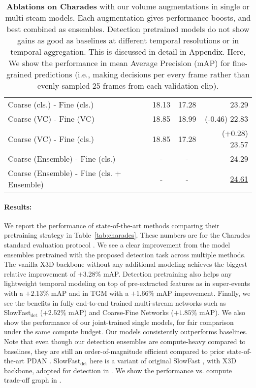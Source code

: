 \documentclass[letterpaper]{article} \usepackage{aaai23}  \usepackage{times}  \usepackage{helvet}  \usepackage{courier}  \usepackage[hyphens]{url}  \usepackage{graphicx} \urlstyle{rm} \def\UrlFont{\rm}  \usepackage{natbib}  \usepackage{caption} \frenchspacing  \setlength{\pdfpagewidth}{8.5in}  \setlength{\pdfpageheight}{11in}  \usepackage{algorithm}
\newcommand{\tref}[1]{Table~\ref{#1}}
\newcommand{\ch}{}
\begin{document}
\begin{table*}[t!]
{\begin{tabular}{l|c|c|r}
			Coarse (cls.) - Fine (cls.) & {18.13} & {17.28} & {23.29} \\
			Coarse (VC) - Fine (VC) & {18.85} & {18.99} & (-0.46) {22.83} \\ 
		    Coarse (VC) - Fine (cls.) & {18.85} & {17.28} & {(+0.28) 23.57} \\ \hline
		    Coarse (Ensemble) - Fine (cls.) & {-} & {-} & {24.29} \\ 
		    Coarse (Ensemble) - Fine (cls. + Ensemble) & {-} & {-} & {\underline{24.61}} \\
	        \end{tabular}
}\hspace{1mm} 


		
		\caption{\textbf{Ablations on Charades} \cite{sigurdsson2016hollywood} with our volume augmentations in single or multi-steam models. Each augmentation gives performance boosts, and best combined as ensembles. Detection pretrained models do not show gains as good as baselines at different temporal resolutions or in temporal aggregation. This is discussed in detail in Appendix. Here, We show the performance in mean Average Precision (mAP) for fine-grained predictions (i.e., making decisions per every frame rather than evenly-sampled 25 frames from each validation clip).
		}
		\label{tab:ablations-main}
\end{table*}

\paragraph{Results:}
\label{subsubsec:main_results}
We report the performance of state-of-the-art methods comparing their pretraining strategy in \tref{tab:charades}. These numbers are for the Charades standard evaluation protocol \cite{sigurdsson2016hollywood}. We see a clear improvement from the model ensembles pretrained with the proposed detection task across multiple methods. The vanilla X3D \cite{feichtenhofer2020x3d} backbone without any additional modeling achieves the biggest relative improvement of $+3.28\%$ mAP. Detection pretraining also helps any lightweight temporal modeling on top of pre-extracted features as in super-events \cite{piergiovanni2018learning} with a $+2.13\%$ mAP and in TGM \cite{piergiovanni2019temporal} with a $+1.66\%$ mAP improvement. Finally, we see the benefits in fully end-to-end trained multi-stream networks such as SlowFast$_\text{det}$ ($+2.52\%$ mAP) and Coarse-Fine Networks \cite{kahatapitiya2021coarse} ($+1.85\%$ mAP). \ch{We also show the performance of our joint-trained single models, for fair comparison under the same compute budget. Our models consistently outperforms baselines. Note that even though our detection ensembles are compute-heavy compared to baselines, they are still an order-of-magnitude efficient compared to prior state-of-the-art PDAN \cite{dai2021pdan}.}
SlowFast$_\text{det}$ here is a variant of original SlowFast \cite{feichtenhofer2019slowfast}, with X3D \cite{feichtenhofer2020x3d} backbone, adopted for detection in \cite{kahatapitiya2021coarse}. We show the performance vs. compute trade-off graph in . 
\end{document}
